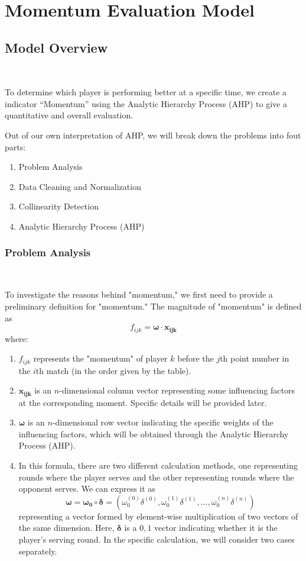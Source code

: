 \section{Momentum Evaluation Model}

\subsection{Model Overview}~{}

To determine which player is performing better at a specific time, we create a indicator ``Momentum'' 
using the Analytic Hierarchy Process (AHP) to give a quantitative and overall evaluation.

Out of our own interpretation of AHP, we will break down the problems into fout parts:

\begin{enumerate}
    \item Problem Analysis
    \item Data Cleaning and Normalization
    \item Collinearity Detection
    \item Analytic Hierarchy Process (AHP)
\end{enumerate}

\subsubsection{Problem Analysis}~{}

\indent To investigate the reasons behind "momentum," we first need to provide a preliminary definition for "momentum." The magnitude of "momentum" is defined as $$f_{ijk}=\boldsymbol{\omega}\cdot\boldsymbol{x_{ijk}}$$
where:
\begin{enumerate}
    \item $f_{ijk}$ represents the "momentum" of player $k$ before the $j$th point number in the $i$th match (in the order given by the table).
    \item $\boldsymbol{x_{ijk}}$ is an $n$-dimensional column vector representing some influencing factors at the corresponding moment. Specific details will be provided later.
    \item $\boldsymbol{\omega}$ is an $n$-dimensional row vector indicating the specific weights of the influencing factors, which will be obtained through the Analytic Hierarchy Process (AHP).
    \item In this formula, there are two different calculation methods, one representing rounds where the player serves and the other representing rounds where the opponent serves. We can express it as $$\boldsymbol{\omega}=\boldsymbol{\omega_0} \circ \boldsymbol{\delta}=(\omega_0^{(0)}\delta^{(0)},\omega_0^{(1)}\delta^{(1)},\dots,\omega_0^{(n)}\delta^{(n)})$$ representing a vector formed by element-wise multiplication of two vectors of the same dimension. Here, $\boldsymbol{\delta}$ is a $0,1$ vector indicating whether it is the player's serving round. In the specific calculation, we will consider two cases separately.
\end{enumerate}

